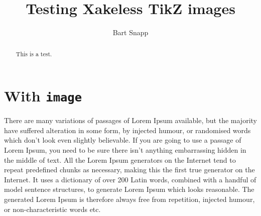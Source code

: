 \documentclass{ximera}
\author{Bart Snapp}
\title{Testing Xakeless TikZ images}
\begin{document}
\begin{abstract}
  This is a test.
\end{abstract}
\maketitle

\section{With \texttt{image}}

There are many variations of passages of Lorem Ipsum available, but
the majority have suffered alteration in some form, by injected
humour, or randomised words which don't look even slightly
believable. If you are going to use a passage of Lorem Ipsum, you need
to be sure there isn't anything embarrassing hidden in the middle of
text. All the Lorem Ipsum generators on the Internet tend to repeat
predefined chunks as necessary, making this the first true generator
on the Internet. It uses a dictionary of over 200 Latin words,
combined with a handful of model sentence structures, to generate
Lorem Ipsum which looks reasonable. The generated Lorem Ipsum is
therefore always free from repetition, injected humour, or
non-characteristic words etc.



\begin{image}
\end{image}
\end{document}
